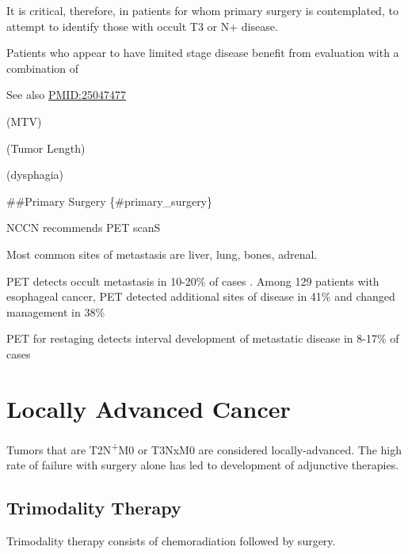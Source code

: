\documentclass[
]{book}
\begin{document}
It is critical, therefore, in patients for whom primary surgery is contemplated, to attempt to identify those with occult T3 or N+ disease.

Patients who appear to have limited stage disease benefit from evaluation with a combination of

See also \url{PMID:25047477}

(MTV)

(Tumor Length)

(dysphagia)

\#\#Primary Surgery \{\#primary\_surgery\}

NCCN recommends PET scanS

Most common sites of metastasis are liver, lung, bones, adrenal.

PET detects occult metastasis in 10-20\% of cases \citep[\citet{kim403}]{kato921}. Among 129 patients with esophageal cancer, PET detected additional sites of disease in 41\% and changed management in 38\% \citep{chatterton354}

PET for restaging detects interval development of metastatic disease in 8-17\% of cases \citep{vanvliet547}

\hypertarget{locally_advanced}{%
\chapter{Locally Advanced Cancer}\label{locally_advanced}}

Tumors that are T2N\textsuperscript{+}M0 or T3NxM0 are considered locally-advanced. The high rate of failure with surgery alone has led to development of adjunctive therapies.

\hypertarget{trimodality}{%
\section{Trimodality Therapy}\label{trimodality}}

Trimodality therapy consists of chemoradiation followed by surgery.
\end{document}
